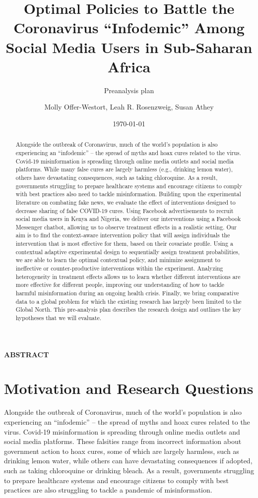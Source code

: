 \documentclass[letterpaper, 12pt, parskip=full,DIV=12]{scrartcl}
\title{Optimal Policies to Battle the Coronavirus ``Infodemic'' Among Social Media Users in Sub-Saharan Africa}
\subtitle{Preanalysis plan}
\author{Molly Offer-Westort, Leah R. Rosenzweig, Susan Athey}
\date{\today}
\begin{document}
%
\normalsize%
\maketitle%
\tableofcontents%
\clearpage%


\centerline{\textbf{ABSTRACT}}
\begin{abstract}
Alongside the outbreak of Coronavirus, much of the world’s population is also experiencing an “infodemic” -- the spread of myths and hoax cures related to the virus. Covid-19 misinformation is spreading through online media outlets and social media platforms. While many false cures are largely harmless (e.g., drinking lemon water), others have devastating consequences, such as taking chloroquine. As a result, governments struggling to prepare healthcare systems and encourage citizens to comply with best practices also need to tackle misinformation. Building upon the experimental literature on combating fake news, we evaluate the effect of interventions designed to decrease sharing of false COVID-19 cures. Using Facebook advertisements to recruit social media users in Kenya and Nigeria, we deliver our interventions using a Facebook Messenger chatbot, allowing us to observe treatment effects in a realistic setting. Our aim is to find the context-aware intervention policy that will assign individuals the intervention that is most effective for them, based on their covariate profile. Using a contextual adaptive experimental design to sequentially assign treatment probabilities, we are able to learn the optimal contextual policy, and minimize assignment to ineffective or counter-productive interventions within the experiment. Analyzing heterogeneity in treatment effects allows us to learn whether different interventions are more effective for different people, improving our understanding of how to tackle harmful misinformation during an ongoing health crisis. Finally, we bring comparative data to a global problem for which the existing research has largely been limited to the Global North. This pre-analysis plan describes the research design and outlines the key hypotheses that we will evaluate.
\end{abstract}





\section{Motivation and Research Questions}

Alongside the outbreak of Coronavirus, much of the world's population is also experiencing an ``infodemic'' -- the spread of myths and hoax cures related to the virus. Covid-19 misinformation is spreading through online media outlets and social media platforms. These falsities range from incorrect information about government action to hoax cures, some of which are largely harmless, such as drinking lemon water, while others can have devastating consequences if adopted, such as taking chloroquine or drinking bleach. As a result, governments struggling to prepare healthcare systems and encourage citizens to comply with best practices are also struggling to tackle a pandemic of misinformation.
\end{document}

